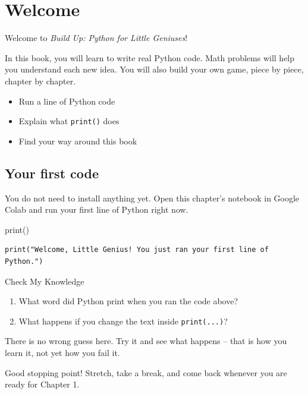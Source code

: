 \chapter{Welcome}
\label{ch:welcome}

Welcome to \emph{Build Up: Python for Little Geniuses}!

In this book, you will learn to write real Python code. Math problems will
help you understand each new idea. You will also build your own game, piece
by piece, chapter by chapter.

\begin{objectivesbox}{}
\begin{itemize}
  \item Run a line of Python code
  \item Explain what \texttt{print()} does
  \item Find your way around this book
\end{itemize}
\end{objectivesbox}

\section{Your first code}

You do not need to install anything yet. Open this chapter's notebook in
Google Colab and run your first line of Python right now.

\begin{codebox}{print()}
\begin{verbatim}
print("Welcome, Little Genius! You just ran your first line of Python.")
\end{verbatim}
\end{codebox}

\begin{knowledgecheck}{Check My Knowledge}
\begin{enumerate}
  \item What word did Python print when you ran the code above?
  \item What happens if you change the text inside \texttt{print(...)}?
\end{enumerate}
There is no wrong guess here. Try it and see what happens -- that is how you
learn it, not yet how you fail it.
\end{knowledgecheck}

Good stopping point! Stretch, take a break, and come back whenever you are
ready for Chapter 1.
